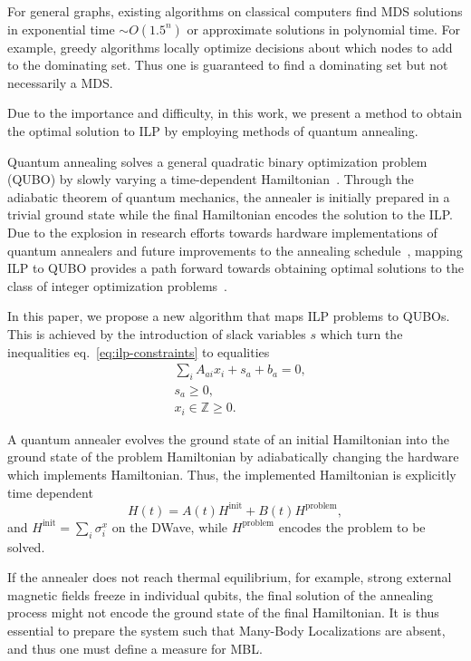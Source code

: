 \documentclass[prd,twocolumn,tightenlines,preprintnumbers,showpacs,superscriptaddress,notitlepage,nofootinbib,eqsecnum,floatfix,longbibliography,aps,10pt]{revtex4-2}
\begin{document}
For general graphs, existing algorithms on classical computers find MDS solutions in exponential time $\sim O( 1.5^n)$ \cite{Fomin2009, vanRooij2009} or approximate solutions in polynomial time. For example, greedy algorithms locally optimize decisions about which nodes to add to the dominating set.
Thus one is guaranteed to find a dominating set but not necessarily a MDS.

Due to the importance and difficulty, in this work, we present a method to obtain the optimal solution to ILP by employing methods of quantum annealing.

Quantum annealing solves a general quadratic binary optimization problem (QUBO) by slowly varying a time-dependent Hamiltonian~\cite{}.
Through the adiabatic theorem of quantum mechanics, the annealer is initially prepared in a trivial ground state while the final Hamiltonian encodes the solution to the ILP.
Due to the explosion in research efforts towards hardware implementations of quantum annealers and future improvements to the annealing schedule~\cite{}, mapping ILP to QUBO provides a path forward towards obtaining optimal solutions to the class of integer optimization problems~\cite{2018Glover}.

In this paper, we propose a new algorithm that maps ILP problems to QUBOs.
This is achieved by the introduction of slack variables $s$ which turn the inequalities eq.~\eqref{eq:ilp-constraints} to equalities
\begin{align}
  & \sum_i A_{a i}x_i + s_a + b_a = 0, \\
  & s_a \geq 0,                \\
  & x_i \in \mathbb{Z} \geq 0.
\end{align}



A quantum annealer evolves the ground state of an initial Hamiltonian into the ground state of the problem Hamiltonian by adiabatically changing the hardware which implements Hamiltonian.
Thus, the implemented Hamiltonian is explicitly time dependent
\begin{equation}
 H(t) = A(t) H^{\textrm{init}} + B(t) H^{\textrm{problem}}, \label{eq:tdhamiltonian}
\end{equation}
and $H^\textrm{init}=\sum_i\sigma^x_i$ on the DWave, while $H^\textrm{problem}$ encodes the problem to be solved.

{\color{red} If the annealer does not reach thermal equilibrium, for example, strong external magnetic fields freeze in individual qubits, the final solution of the annealing process might not encode the ground state of the final Hamiltonian.
It is thus essential to prepare the system such that Many-Body Localizations are absent, and thus one must define a measure for MBL. }
\end{document}
